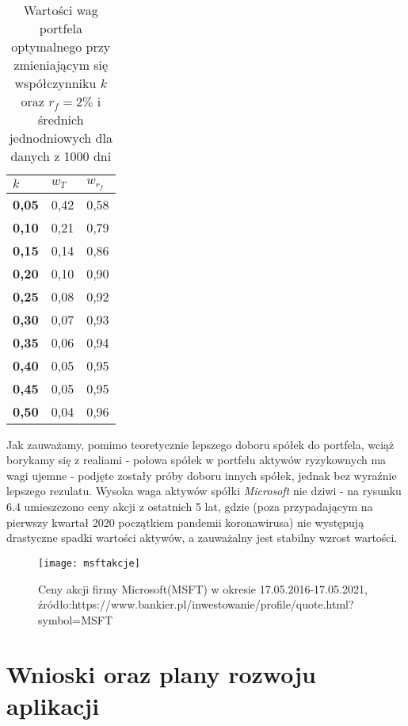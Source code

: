 \documentclass[magister]{dyplom}
\begin{document}
\begin{table}[ht]
	\centering
	\caption{Wartości wag portfela optymalnego przy zmieniającym się współczynniku $k$ oraz $r_f = 2\%$ i średnich jednodniowych dla danych z 1000 dni}
	\begin{tabular}{|l|l|l|}
		\hline
		\textbf{$k$} & \textbf{$w_T$} & \textbf{$w_{r_f}$} \\ \hline
		\textbf{0,05} & 0,42          & 0,58           \\ \hline
		\textbf{0,10} & 0,21          & 0,79           \\ \hline
		\textbf{0,15} & 0,14          & 0,86           \\ \hline
		\textbf{0,20} & 0,10          & 0,90           \\ \hline
		\textbf{0,25} & 0,08          & 0,92           \\ \hline
		\textbf{0,30} & 0,07          & 0,93           \\ \hline
		\textbf{0,35} & 0,06          & 0,94           \\ \hline
		\textbf{0,40} & 0,05          & 0,95           \\ \hline
		\textbf{0,45} & 0,05          & 0,95           \\ \hline
		\textbf{0,50} & 0,04          & 0,96           \\ \hline
	\end{tabular}
\end{table}
\newpage
Jak zauważamy, pomimo teoretycznie lepszego doboru spółek do portfela, wciąż borykamy się z realiami - połowa spółek w portfelu aktywów ryzykownych ma wagi ujemne - podjęte zostały próby doboru innych spółek, jednak bez wyraźnie lepszego rezulatu. Wysoka waga aktywów spółki \textit{Microsoft} nie dziwi - na rysunku 6.4 umieszczono ceny akcji z ostatnich 5 lat, gdzie (poza przypadającym na pierwszy kwartał 2020 początkiem pandemii koronawirusa) nie występują drastyczne spadki wartości aktywów, a zauważalny jest stabilny wzrost wartości.

\begin{figure}[ht]
	\centering
	\texttt{[image: msftakcje]}
	\caption{Ceny akcji firmy Microsoft(MSFT) w okresie 17.05.2016-17.05.2021,\newline
		źródło:https://www.bankier.pl/inwestowanie/profile/quote.html?symbol=MSFT}
\end{figure}


\chapter{Wnioski oraz plany rozwoju aplikacji}
\end{document}

